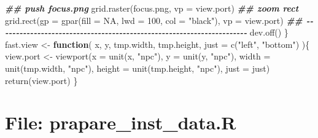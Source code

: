 \documentclass[
]{article}
\newenvironment{Shaded}{\begin{snugshade}}{\end{snugshade}}
\newcommand{\AttributeTok}[1]{\textcolor[rgb]{0.77,0.63,0.00}{#1}}
\newcommand{\ConstantTok}[1]{\textcolor[rgb]{0.00,0.00,0.00}{#1}}
\newcommand{\ControlFlowTok}[1]{\textcolor[rgb]{0.13,0.29,0.53}{\textbf{#1}}}
\newcommand{\DecValTok}[1]{\textcolor[rgb]{0.00,0.00,0.81}{#1}}
\newcommand{\DocumentationTok}[1]{\textcolor[rgb]{0.56,0.35,0.01}{\textbf{\textit{#1}}}}
\newcommand{\FunctionTok}[1]{\textcolor[rgb]{0.00,0.00,0.00}{#1}}
\newcommand{\NormalTok}[1]{#1}
\newcommand{\OtherTok}[1]{\textcolor[rgb]{0.56,0.35,0.01}{#1}}
\newcommand{\StringTok}[1]{\textcolor[rgb]{0.31,0.60,0.02}{#1}}
\begin{document}
\begin{Shaded}
\begin{Highlighting}[]
    \DocumentationTok{\#\# push focus.png}
    \FunctionTok{grid.raster}\NormalTok{(focus.png, }\AttributeTok{vp =}\NormalTok{ view.port)}
    \DocumentationTok{\#\# zoom rect}
    \FunctionTok{grid.rect}\NormalTok{(}\AttributeTok{gp =} \FunctionTok{gpar}\NormalTok{(}\AttributeTok{fill =} \ConstantTok{NA}\NormalTok{, }\AttributeTok{lwd =} \DecValTok{100}\NormalTok{, }\AttributeTok{col =} \StringTok{"black"}\NormalTok{),}
              \AttributeTok{vp =}\NormalTok{ view.port)}
    \DocumentationTok{\#\# {-}{-}{-}{-}{-}{-}{-}{-}{-}{-}{-}{-}{-}{-}{-}{-}{-}{-}{-}{-}{-}{-}{-}{-}{-}{-}{-}{-}{-}{-}{-}{-}{-}{-}{-}{-}{-}{-}{-}{-}{-}{-}{-}{-}{-}{-}{-}{-}{-}{-}{-}{-}{-}{-}{-}{-}{-}{-}{-}{-}{-}{-}{-}{-}{-}{-}{-}{-}{-}{-} }
    \FunctionTok{dev.off}\NormalTok{()}
\NormalTok{  \}}
\NormalTok{fast.view }\OtherTok{\textless{}{-}}
  \ControlFlowTok{function}\NormalTok{(}
\NormalTok{           x, y, tmp.width, tmp.height,}
           \AttributeTok{just =} \FunctionTok{c}\NormalTok{(}\StringTok{"left"}\NormalTok{, }\StringTok{"bottom"}\NormalTok{)}
\NormalTok{           )\{}
\NormalTok{  view.port }\OtherTok{\textless{}{-}} \FunctionTok{viewport}\NormalTok{(}\AttributeTok{x =} \FunctionTok{unit}\NormalTok{(x, }\StringTok{"npc"}\NormalTok{),}
                        \AttributeTok{y =} \FunctionTok{unit}\NormalTok{(y, }\StringTok{"npc"}\NormalTok{),}
                        \AttributeTok{width =} \FunctionTok{unit}\NormalTok{(tmp.width, }\StringTok{"npc"}\NormalTok{),}
                        \AttributeTok{height =} \FunctionTok{unit}\NormalTok{(tmp.height, }\StringTok{"npc"}\NormalTok{),}
                        \AttributeTok{just =}\NormalTok{ just)}
  \FunctionTok{return}\NormalTok{(view.port)}
\NormalTok{\}}
\end{Highlighting}
\end{Shaded}

\hypertarget{file-prapare_inst_data.r}{%
\section{File: prapare\_inst\_data.R}\label{file-prapare_inst_data.r}}
\end{document}
